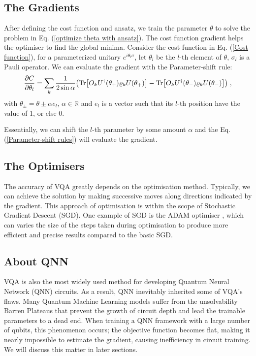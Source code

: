 \subsection{The Gradients}
After defining the cost function and ansatz, we train the parameter $\theta$ to solve the problem in Eq. (\ref{optimize theta with ansatz}).
The cost function gradient helps the optimiser to find the global minima. 
Consider the cost function in Eq. (\ref{Cost function}), for a parameterized unitary $e^{i \theta_l \sigma}$, let $\theta_l$ be the $l$-th element of $\theta$, $\sigma_l$ is a Pauli operator. 
We can evaluate the gradient with the Parameter-shift rule:
\begin{equation}
    \frac{\partial C}{\partial\theta_l}
    = \sum_k \frac{1}{2 \sin{\alpha}} 
    \left( 
        \Tr[O_k U^\dagger(\theta_+) \rho_k U(\theta_+)] 
        - \Tr[O_k U^\dagger(\theta_-) \rho_k U(\theta_-)]
    \right) \;,
    \label{Parameter-shift rules}
\end{equation}
with $\theta_{\pm} = \theta \pm \alpha e_l$, $\alpha \in \mathbb{R}$ and $e_l$ is a vector such that its $l$-th position have the value of 1, or else 0.

Essentially, we can shift the $l$-th parameter by some amount $\alpha$ and the Eq. (\ref{Parameter-shift rules}) will evaluate the gradient. 


\subsection{The Optimisers}
The accuracy of VQA greatly depends on the optimisation method.
Typically, we can achieve the solution by making successive moves along directions indicated by the gradient.
This approach of optimisation is within the scope of Stochastic Gradient Descent (SGD).
One example of SGD is the ADAM optimiser \cite{kingmaAdamMethodStochastic2014}, which can varies the size of the steps taken during optimisation to produce more efficient and precise results compared to the basic SGD.


\subsection{About QNN}
VQA is also the most widely used method for developing Quantum Neural Network (QNN) circuits. 
As a result, QNN inevitably inherited some of VQA's flaws.
Many Quantum Machine Learning models suffer from the unsolvability Barren Plateaus \cite{zhaoReviewQuantumNeural2021} that prevent the growth of circuit depth and lead the trainable parameters to a dead end.
When training a QNN framework with a large number of qubits, this phenomenon occurs; the objective function becomes flat, making it nearly impossible to estimate the gradient, \cite{mccleanBarrenPlateausQuantum2018, zhaoAnalyzingBarrenPlateau2021} causing inefficiency in circuit training. We will discuss this matter in later sections.

